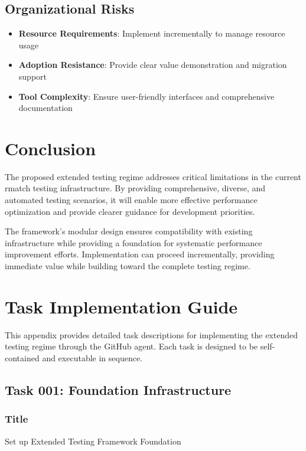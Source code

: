 \documentclass[11pt,a4paper]{article}
\begin{document}
\subsection{Organizational Risks}

\begin{itemize}
    \item \textbf{Resource Requirements}: Implement incrementally to manage resource usage
    \item \textbf{Adoption Resistance}: Provide clear value demonstration and migration support
    \item \textbf{Tool Complexity}: Ensure user-friendly interfaces and comprehensive documentation
\end{itemize}

\section{Conclusion}

The proposed extended testing regime addresses critical limitations in the current rmatch testing infrastructure. By providing comprehensive, diverse, and automated testing scenarios, it will enable more effective performance optimization and provide clearer guidance for development priorities.

The framework's modular design ensures compatibility with existing infrastructure while providing a foundation for systematic performance improvement efforts. Implementation can proceed incrementally, providing immediate value while building toward the complete testing regime.

\appendix

\section{Task Implementation Guide}

This appendix provides detailed task descriptions for implementing the extended testing regime through the GitHub agent. Each task is designed to be self-contained and executable in sequence.

\subsection{Task 001: Foundation Infrastructure}

\subsubsection{Title}
Set up Extended Testing Framework Foundation
\end{document}
